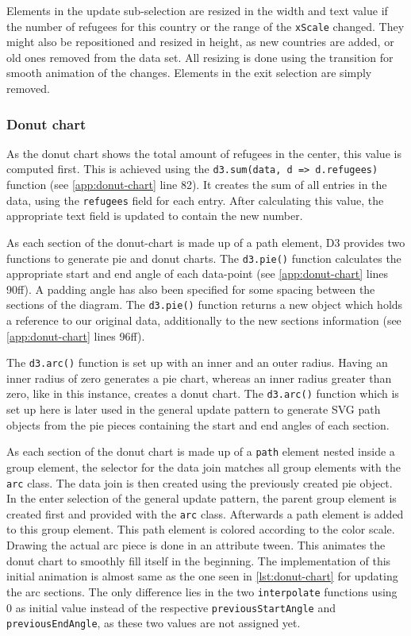 Elements in the update sub-selection are resized in the width and text value if the number of refugees for this country or the range of the \texttt{xScale} changed. They might also be repositioned and resized in height, as new countries are added, or old ones removed from the data set. All resizing is done using the transition for smooth animation of the changes. Elements in the exit selection are simply removed.

\subsubsection{Donut chart}

As the donut chart shows the total amount of refugees in the center, this value is computed first. This is achieved using the \texttt{d3.sum(data, d => d.refugees)} function (see \ref{app:donut-chart} line 82). It creates the sum of all entries in the data, using the \texttt{refugees} field for each entry. After calculating this value, the appropriate text field is updated to contain the new number.

As each section of the donut-chart is made up of a path element, D3 provides two functions to generate pie and donut charts. The \texttt{d3.pie()} function calculates the appropriate start and end angle of each data-point (see \ref{app:donut-chart} lines 90ff). A padding angle has also been specified for some spacing between the sections of the diagram. The \texttt{d3.pie()} function returns a new object which holds a reference to our original data, additionally to the new sections information (see \ref{app:donut-chart} lines 96ff). 

The \texttt{d3.arc()} function is set up with an inner and an outer radius. Having an inner radius of zero generates a pie chart, whereas an inner radius greater than zero, like in this instance, creates a donut chart. The \texttt{d3.arc()} function which is set up here is later used in the general update pattern to generate SVG path objects from the pie pieces containing the start and end angles of each section.

As each section of the donut chart is made up of a \texttt{path} element nested inside a group element, the selector for the data join matches all group elements with the \texttt{arc} class. The data join is then created using the previously created pie object. In the enter selection of the general update pattern, the parent group element is created first and provided with the \texttt{arc} class. Afterwards a path element is added to this group element. This path element is colored according to the color scale. Drawing the actual arc piece is done in an attribute tween. This animates the donut chart to smoothly fill itself in the beginning. The implementation of this initial animation is almost same as the one seen in \ref{lst:donut-chart} for updating the arc sections. The only difference lies in the two \texttt{interpolate} functions using 0 as initial value instead of the respective \texttt{previousStartAngle} and \texttt{previousEndAngle}, as these two values are not assigned yet.

